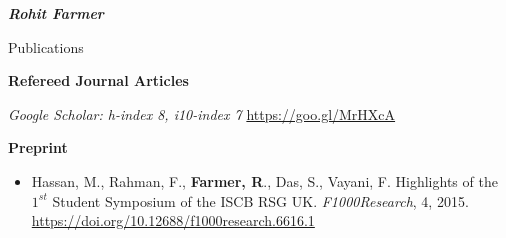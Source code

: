 \documentclass[10pt]{article}
\begin{document}
\begin{cv}{\huge \it \bfseries Rohit Farmer}
\begin{cvlist}{Publications}
\vskip3pt
\item {\bf Refereed Journal Articles}
\item {\textit{Google Scholar: h-index 8, i10-index 7} \url{https://goo.gl/MrHXcA}}
\vskip3pt
\item{ }


\vskip3pt
\item {\textbf{Preprint}}
\item {\begin{itemize}\item Hassan, M.,  Rahman, F., \textbf{Farmer, R}., Das, S., Vayani, F. Highlights of the $1^{st}$ Student Symposium of the ISCB RSG UK. \emph{F1000Research}, 4, 2015. \url{https://doi.org/10.12688/f1000research.6616.1} \end{itemize}}

\end{cvlist}
\end{cv}
\end{document}
